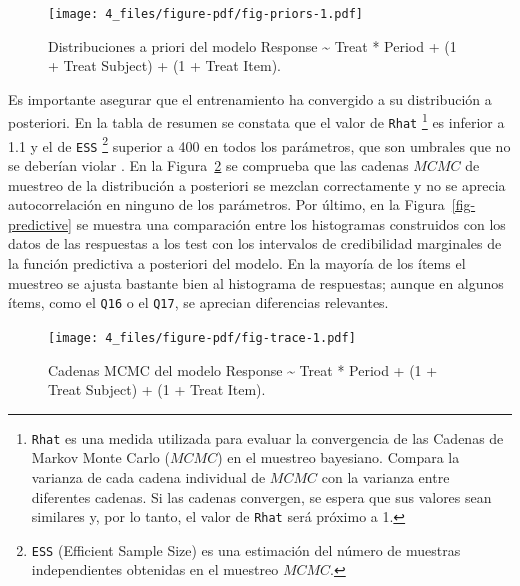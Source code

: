\documentclass[
  12pt,
  a4paper,
  extrafontsizes,
  onecolumn,
  openright,
  table]{memoir}
\begin{document}
\normalsize

\begin{figure}[h]

{\centering \texttt{[image: 4\_files/figure-pdf/fig-priors-1.pdf]}

}

\caption[Distribuciones a priori del modelo
seleccionado.]{\label{fig-priors}Distribuciones a priori del modelo
Response \textasciitilde{} Treat * Period + (1 + Treat \textbar{}
Subject) + (1 + Treat \textbar{} Item).}

\end{figure}

Es importante asegurar que el entrenamiento ha convergido a su
distribución a posteriori. En la tabla de resumen se constata que el
valor de \texttt{Rhat} \footnote{\texttt{Rhat} es una medida utilizada
  para evaluar la convergencia de las Cadenas de Markov Monte Carlo
  (\(MCMC\)) en el muestreo bayesiano. Compara la varianza de cada
  cadena individual de \(MCMC\) con la varianza entre diferentes
  cadenas. Si las cadenas convergen, se espera que sus valores sean
  similares y, por lo tanto, el valor de \texttt{Rhat} será próximo a 1.}
es inferior a 1.1 y el de \texttt{ESS} \footnote{\texttt{ESS} (Efficient
  Sample Size) es una estimación del número de muestras independientes
  obtenidas en el muestreo \(MCMC\).} superior a 400 en todos los
parámetros, que son umbrales que no se deberían violar
\autocite[ver][]{burkner2019}. En la Figura~\ref{fig-trace} se comprueba
que las cadenas \(MCMC\) de muestreo de la distribución a posteriori se
mezclan correctamente y no se aprecia autocorrelación en ninguno de los
parámetros. Por último, en la Figura~\ref{fig-predictive} se muestra una
comparación entre los histogramas construidos con los datos de las
respuestas a los test con los intervalos de credibilidad marginales de
la función predictiva a posteriori del modelo. En la mayoría de los
ítems el muestreo se ajusta bastante bien al histograma de respuestas;
aunque en algunos ítems, como el \texttt{Q16} o el \texttt{Q17}, se
aprecian diferencias relevantes.

\begin{figure}[h]

{\centering \texttt{[image: 4\_files/figure-pdf/fig-trace-1.pdf]}

}

\caption[Cadenas MCMC del modelo seleccionado.]{\label{fig-trace}Cadenas
MCMC del modelo Response \textasciitilde{} Treat * Period + (1 + Treat
\textbar{} Subject) + (1 + Treat \textbar{} Item).}

\end{figure}
\end{document}
